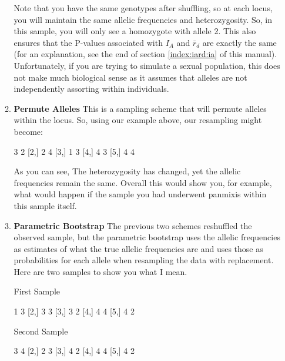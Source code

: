 \documentclass[letterpaper]{article}
\begin{document}
\begin{itemize}
\begin{enumerate}
Note that you have the same genotypes after shuffling, so at each locus, you will maintain the same allelic frequencies and heterozygosity. So, in this sample, you will only see a homozygote with allele 2. This also ensures that the P-values associated with $I_A$ and $\bar r_d$ are exactly the same (for an explanation, see the end of section \ref{index:iard:ia} of this manual). Unfortunately, if you are trying to simulate a sexual population, this does not make much biological sense as it assumes that alleles are not independently assorting within individuals.
    \item \textbf{Permute Alleles} This is a sampling scheme that will permute alleles within the locus. So, using our example above, our resampling might become:
\begin{Schunk}
\begin{Soutput}
     [,1] [,2]
[1,]    3    2
[2,]    2    4
[3,]    1    3
[4,]    4    3
[5,]    4    4
\end{Soutput}
\end{Schunk}
As you can see, The heterozygosity has changed, yet the allelic frequencies remain the same. Overall this would show you, for example, what would happen if the sample you had underwent panmixis within this sample itself. 
    \item \textbf{Parametric Bootstrap} The previous two schemes reshuffled the observed sample, but the parametric bootstrap uses the allelic frequencies as estimates of what the true allelic frequencies are and uses those as probabilities for each allele when resampling the data with replacement. Here are two samples to show you what I mean.
\begin{Schunk}
\begin{Soutput}
First Sample
\end{Soutput}
\begin{Soutput}
     [,1] [,2]
[1,]    1    3
[2,]    3    3
[3,]    3    2
[4,]    4    4
[5,]    4    2
\end{Soutput}
\begin{Soutput}
Second Sample
\end{Soutput}
\begin{Soutput}
     [,1] [,2]
[1,]    3    4
[2,]    2    3
[3,]    4    2
[4,]    4    4
[5,]    4    2
\end{Soutput}
\end{Schunk}


\end{enumerate}
\end{itemize}
\end{document}
